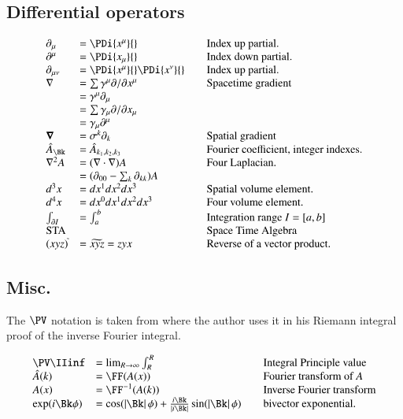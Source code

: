 \subsection{Differential operators}
\begin{equation*}
\begin{array}{l l l}
\partial_{\mu} &= \PDi{x^\mu}{} & \quad \mbox{Index up partial.} \\
\partial^{\mu} &= \PDi{x_\mu}{} & \quad \mbox{Index down partial.} \\
\partial_{\mu\nu} &= \PDi{x^\mu}{}\PDi{x^\nu}{} & \quad \mbox{Index up partial.} \\
\grad &= \sum \gamma^{\mu} \partial/\partial {x^{\mu}} & \quad \mbox{Spacetime gradient} \\
      &= \gamma^{\mu}\partial_{\mu} \\
      &= \sum \gamma_{\mu} \partial/\partial {x_{\mu}} \\
      &= \gamma_{\mu}\partial^{\mu} \\
\spacegrad &= \sigma^{k} \partial_k & \quad \mbox{Spatial gradient} \\
\hat{A}_{\Bk} &= \hat{A}_{k_1,k_2,k_3} & \quad \mbox{Fourier coefficient, integer indexes.} \\
\grad^2 A
   &= (\grad \cdot \grad) A & \quad \mbox{Four Laplacian. } \\
   &= (\partial_{00} - \sum_k \partial_{kk}) A & \\
d^3 x &= dx^1 dx^2 dx^3 & \quad \mbox{Spatial volume element. } \\
d^4 x &= dx^0 dx^1 dx^2 dx^3 & \quad \mbox{Four volume element. } \\
\int_{\partial I} &= \int_{a}^{b} & \quad \mbox{Integration range $I = [a,b]$ } \\
\text{STA} & & \quad \mbox{Space Time Algebra} \\
(xyz)^{\tilde{}} &= \widetilde{xyz} = z y x & \quad \mbox{Reverse of a vector product.} \\
\end{array}
\end{equation*}

\subsection{Misc.}

The $\PV$ notation is taken from \cite{lepage1980cva} where the author uses it in his Riemann integral proof of the inverse Fourier integral.

\begin{equation*}
\begin{array}{l l l}
\PV \IIinf &= \lim_{R\rightarrow \infty} \int_{R}^R & \quad \mbox{Integral Principle value} \\
\hat{A}(k) &= \FF(A(x)) & \quad \mbox{Fourier transform of $A$} \\
{A}(x) &= \FF^{-1}(A(k)) & \quad \mbox{Inverse Fourier transform} \\
\exp(i\Bk\phi) &=
\cos(\Abs{\Bk}\phi) + \frac{i \Bk}{\Abs{i\Bk}} \sin(\Abs{\Bk}\phi) & \quad \mbox{bivector exponential. } \\
\end{array}
\end{equation*}

